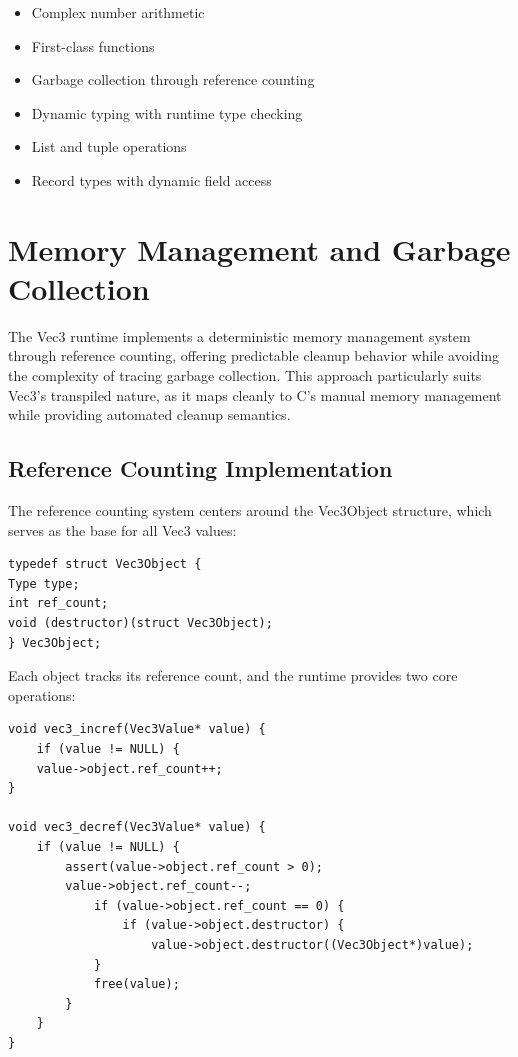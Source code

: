 \begin{itemize}[nolistsep]
\item Complex number arithmetic
\item First-class functions
\item Garbage collection through reference counting
\item Dynamic typing with runtime type checking
\item List and tuple operations
\item Record types with dynamic field access
\end{itemize}

\section{Memory Management and Garbage Collection}
\label{sec:memory-management}

The Vec3 runtime implements a deterministic memory management system through reference counting, offering predictable cleanup behavior while avoiding the complexity of tracing garbage collection.
This approach particularly suits Vec3's transpiled nature, as it maps cleanly to C's manual memory management while providing automated cleanup semantics.

\subsection{Reference Counting Implementation}\label{subsec:reference-counting-implementation}
The reference counting system centers around the Vec3Object structure, which serves as the base for all Vec3 values:

\begin{verbatim}
typedef struct Vec3Object {
Type type;
int ref_count;
void (destructor)(struct Vec3Object);
} Vec3Object;
\end{verbatim}

Each object tracks its reference count, and the runtime provides two core operations:

\begin{verbatim}
void vec3_incref(Vec3Value* value) {
    if (value != NULL) {
    value->object.ref_count++;
}

void vec3_decref(Vec3Value* value) {
    if (value != NULL) {
        assert(value->object.ref_count > 0);
        value->object.ref_count--;
            if (value->object.ref_count == 0) {
                if (value->object.destructor) {
                    value->object.destructor((Vec3Object*)value);
            }
            free(value);
        }
    }
}
\end{verbatim}

